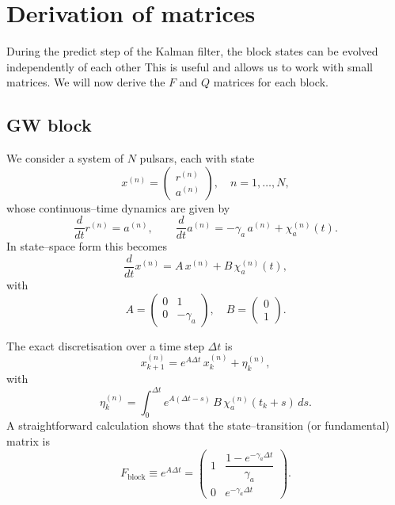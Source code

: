 \documentclass{tufte-handout} %
\begin{document}
\newpage 

\appendix

\section{Derivation of matrices}\label{sec:derivation_of_matrices}


During the predict step of the Kalman filter, the block states can be evolved independently of each other
This is useful and allows us to work with small matrices. We will now derive the $F$ and $Q$ matrices for each block.



\subsection{GW block}
We consider a system of $N$ pulsars, each with state
\begin{equation}
x^{(n)} = \begin{pmatrix} r^{(n)} \\[1mm] a^{(n)} \end{pmatrix}, \quad n=1,\ldots,N,
\end{equation}
whose continuous--time dynamics are given by
\begin{equation}
\frac{d}{dt}r^{(n)} = a^{(n)}, \qquad \frac{d}{dt}a^{(n)} = -\gamma_a\,a^{(n)} + \chi_a^{(n)}(t).
\end{equation}
In state--space form this becomes
\begin{equation}
\frac{d}{dt} x^{(n)} = A\,x^{(n)} + B\,\chi_a^{(n)}(t),
\end{equation}
with
\begin{equation}
A=\begin{pmatrix} 0 & 1 \\[0.5mm] 0 & -\gamma_a \end{pmatrix}, \quad
B=\begin{pmatrix} 0 \\[0.5mm] 1 \end{pmatrix}.
\end{equation}

The exact discretisation over a time step $\Delta t$ is
\begin{equation}
x_{k+1}^{(n)} = e^{A\Delta t}\,x_k^{(n)} + \eta_k^{(n)},
\end{equation}
with
\begin{equation}
\eta_k^{(n)} = \int_0^{\Delta t} e^{A(\Delta t-s)}\,B\,\chi_a^{(n)}(t_k+s)\,ds.
\end{equation}
A straightforward calculation shows that the state--transition (or fundamental) matrix is
\begin{equation}
F_{\text{block}} \equiv e^{A\Delta t} =
\begin{pmatrix}
1 & \dfrac{1-e^{-\gamma_a\Delta t}}{\gamma_a} \\[1mm]
0 & e^{-\gamma_a\Delta t}
\end{pmatrix}.
\end{equation}
\end{document}
